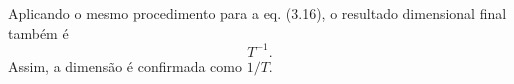 Aplicando o mesmo procedimento para a eq. (3.16), o resultado dimensional final também é
\[
T^{-1}.
\]
Assim, a dimensão é confirmada como $1/T$.

